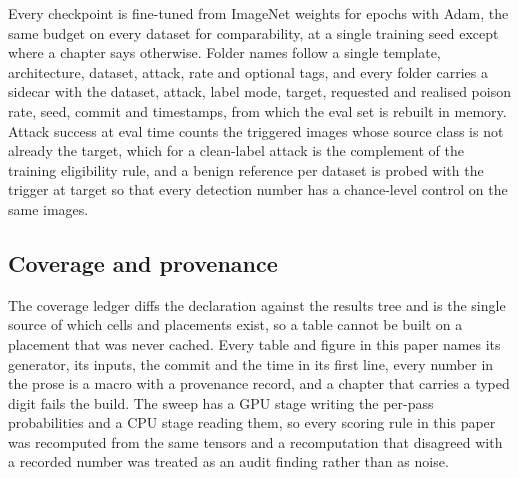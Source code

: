 \documentclass[../main.tex]{subfiles}
\begin{document}
Every checkpoint is fine-tuned from ImageNet weights for \TrainingEpochs{} epochs with Adam, the same budget on every dataset for comparability, at a single training seed except where a chapter says otherwise. Folder names follow a single template, architecture, dataset, attack, rate and optional tags, and every folder carries a sidecar with the dataset, attack, label mode, target, requested and realised poison rate, seed, commit and timestamps, from which the eval set is rebuilt in memory. Attack success at eval time counts the triggered images whose source class is not already the target, which for a clean-label attack is the complement of the training eligibility rule, and a benign reference per dataset is probed with the \BenignProbeAttack{} trigger at target \BenignProbeTarget{} so that every detection number has a chance-level control on the same images.

\subsection{Coverage and provenance}

The coverage ledger diffs the declaration against the results tree and is the single source of which cells and placements exist, so a table cannot be built on a placement that was never cached. Every table and figure in this paper names its generator, its inputs, the commit and the time in its first line, every number in the prose is a macro with a provenance record, and a chapter that carries a typed digit fails the build. The sweep has a GPU stage writing the per-pass probabilities and a CPU stage reading them, so every scoring rule in this paper was recomputed from the same tensors and a recomputation that disagreed with a recorded number was treated as an audit finding rather than as noise.
\end{document}
